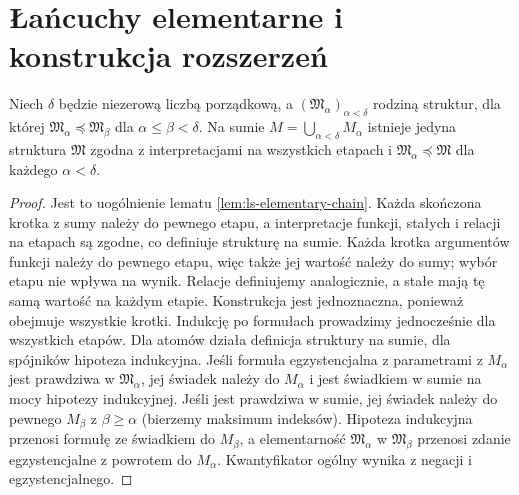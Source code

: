 \section{Łańcuchy elementarne i konstrukcja rozszerzeń}
\begin{lemat}
\label{lem:mod-saturation-chain}
Niech $\delta$ będzie niezerową liczbą porządkową,
a $(\mathfrak M_\alpha)_{\alpha<\delta}$ rodziną
struktur, dla której $\mathfrak M_\alpha\preccurlyeq
\mathfrak M_\beta$ dla $\alpha\leq\beta<\delta$.
Na sumie $M=\bigcup_{\alpha<\delta}M_\alpha$ istnieje
jedyna struktura $\mathfrak M$ zgodna z interpretacjami
na wszystkich etapach i
$\mathfrak M_\alpha\preccurlyeq\mathfrak M$
dla każdego $\alpha<\delta$.
\end{lemat}
\begin{proof}
Jest to uogólnienie lematu \ref{lem:ls-elementary-chain}.
Każda skończona krotka z sumy należy do pewnego etapu,
a interpretacje funkcji, stałych i relacji na etapach
są zgodne, co definiuje strukturę na sumie. Każda krotka
argumentów funkcji należy do pewnego etapu, więc także
jej wartość należy do sumy; wybór etapu nie wpływa na
wynik. Relacje definiujemy analogicznie, a stałe mają
tę samą wartość na każdym etapie. Konstrukcja jest
jednoznaczna, ponieważ obejmuje wszystkie krotki.
Indukcję po formułach prowadzimy jednocześnie dla
wszystkich etapów. Dla atomów działa definicja
struktury na sumie, dla spójników hipoteza indukcyjna.
Jeśli formuła egzystencjalna z parametrami z $M_\alpha$
jest prawdziwa w $\mathfrak M_\alpha$, jej świadek
należy do $M_\alpha$ i jest świadkiem w sumie na mocy
hipotezy indukcyjnej. Jeśli jest prawdziwa w sumie,
jej świadek należy do pewnego $M_\beta$ z $\beta\geq\alpha$
(bierzemy maksimum indeksów). Hipoteza indukcyjna
przenosi formułę ze świadkiem do $M_\beta$,
a elementarność $\mathfrak M_\alpha$ w $\mathfrak M_\beta$
przenosi zdanie egzystencjalne z powrotem do $M_\alpha$.
Kwantyfikator ogólny wynika z negacji i egzystencjalnego.
\end{proof}

